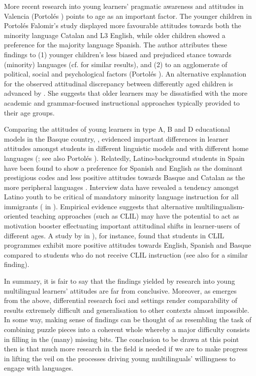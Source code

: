 \documentclass[output=paper]{../langscibook}
\begin{document}
More recent research into young learners’ pragmatic awareness and attitudes in Valencia (Portolés \citealt[172]{Falomir2015}) points to age as an important factor. The younger children in Portolés Falomir’s study displayed more favourable attitudes towards both the minority language Catalan and L3 English, while older children showed a preference for the majority language Spanish. The author attributes these findings to (1) younger children’s less biased and prejudiced stance towards (minority) languages (cf. \citealt[213]{Cenoz2004} for similar results), and (2) to an agglomerate of political, social and psychological factors (Portolés \citealt[172]{Falomir2015}). An alternative explanation for the observed attitudinal discrepancy between differently aged children is advanced by \citet[214]{Cenoz2004}. She suggests that older learners may be dissatisfied with the more academic and grammar-focused instructional approaches typically provided to their age groups. 

Comparing the attitudes of young learners in type A, B and D educational models in the Basque country, \citet{Lasagabaster2005}, evidenced important differences in learner attitudes amongst students in different linguistic models and with different home languages (\citealt[585]{Lasagabaster2017}; see also Portolés \citealt[172]{Falomir2015}). Relatedly, Latino-background students in Spain have been found to show a preference for Spanish and English as the dominant prestigious codes and less positive attitudes towards Basque and Catalan as the more peripheral languages \citep[589]{Lasagabaster2017}. Interview data have revealed a tendency amongst Latino youth to be critical of mandatory minority language instruction for all immigrants (\citealt{LaprestaEtAl2010} in \citealt[589]{Lasagabaster2017}). Empirical evidence suggests that alternative multilingualism-oriented teaching approaches (such as CLIL) may have the potential to act as motivation booster effectuating important attitudinal shifts in learner-users of different ages. A study by \citet{LasagabasterSierra2009} in \citealt[590]{Lasagabaster2017}), for instance, found that students in CLIL programmes exhibit more positive attitudes towards English, Spanish and Basque compared to students who do not receive CLIL instruction (see also  for a similar finding).

In summary, it is fair to say that the findings yielded by research into young multilingual learners’ attitudes are far from conclusive. Moreover, as emerges from the above, differential research foci and settings render comparability of results extremely difficult and generalisation to other contexts almost impossible. In some way, making sense of findings can be thought of as resembling the task of combining puzzle pieces into a coherent whole whereby a major difficulty consists in filling in the (many) missing bits. The conclusion to be drawn at this point then is that much more research in the field is needed if we are to make progress in lifting the veil on the processes driving young multilinguals’ willingness to engage with languages.   
\end{document}
